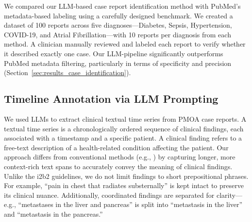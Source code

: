 We compared our LLM-based case report identification method with PubMed's metadata-based labeling using a carefully designed benchmark. We created a dataset of 100 reports across five diagnoses—Diabetes, Sepsis, Hypertension, COVID-19, and Atrial Fibrillation—with 10 reports per diagnosis from each method. A clinician manually reviewed and labeled each report to verify whether it described exactly one case. Our LLM-pipeline significantly outperforms PubMed metadata filtering, particularly in terms of specificity and precision (Section~\ref{sec:results_case_identification}).





\subsection{Timeline Annotation via LLM Prompting}
We used LLMs to extract clinical textual time series from PMOA case reports. A textual time series is a chronologically ordered sequence of clinical findings, each associated with a timestamp and a specific patient. A clinical finding refers to a free-text description of a health-related condition affecting the patient. Our approach differs from conventional methods (e.g., \cite{sun2013evaluating, uzuner20112010}) by capturing longer, more context-rich text spans to accurately convey the meaning of clinical findings. Unlike the i2b2 guidelines, we do not limit findings to short prepositional phrases. For example, ``pain in chest that radiates substernally'' is kept intact to preserve its clinical nuance. Additionally, coordinated findings are separated for clarity—e.g., ``metastases in the liver and pancreas'' is split into ``metastasis in the liver'' and ``metastasis in the pancreas.''

